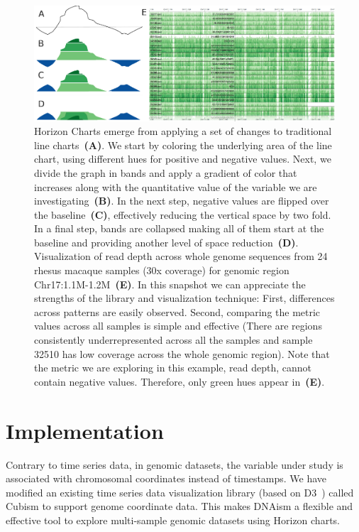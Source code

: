 \documentclass{bioinfo}
\begin{document}
\begin{figure}
\centerline{\includegraphics[width=1\textwidth,natwidth=485.65,natheight=187.53]{figure.pdf}}
\caption{
Horizon Charts emerge from applying a set of changes to traditional line
charts~\textbf{(A)}. We start by coloring the underlying area of the line chart,
using different hues for positive and negative values. Next, we divide the
graph in bands and apply a gradient of color that increases along with the
quantitative value of the variable we are investigating~\textbf{(B)}. In the
next step, negative values are flipped over the baseline~\textbf{(C)},
effectively reducing the vertical space by two fold. In a final step, bands are
collapsed making all of them start at the baseline and providing another level
of space reduction~\textbf{(D)}.  Visualization of read depth across whole
genome sequences from 24 rhesus macaque samples (30x coverage) for genomic
region Chr17:1.1M-1.2M~\textbf{(E)}. In this snapshot we can appreciate the
strengths of the library and visualization technique: First, differences across
patterns are easily observed.  Second, comparing the metric values across all
samples is simple and effective (There are regions consistently
underrepresented across all the samples and sample 32510 has low coverage
across the whole genomic region). Note that the metric we are exploring in 
this example, read depth, cannot contain negative values. Therefore, only 
green hues appear in~\textbf{(E)}.
}\label{fig:01}
\end{figure}

\section{Implementation}

Contrary to time series data, in genomic datasets, the variable under study is
associated with chromosomal coordinates instead of timestamps. We have modified
an existing time series data visualization library (based on D3~\citep{2011-d3})
called Cubism to support genome coordinate data. This makes DNAism
a flexible and effective tool to explore multi-sample genomic datasets using
Horizon charts.
\end{document}
